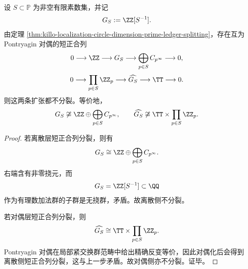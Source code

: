 \begin{theorem}[局部化数系扩张在离散层与对偶层都严格不分裂]\label{thm:conclusion-localized-discrete-dual-extension-nonsplit}
设 \(S\subset\mathbb P\) 为非空有限素数集，并记
\[
G_S:=\ZZ[S^{-1}].
\]
由定理 \ref{thm:killo-localization-circle-dimension-prime-ledger-splitting}，存在互为 Pontryagin 对偶的短正合列
\[
0\longrightarrow \ZZ\longrightarrow G_S\longrightarrow \bigoplus_{p\in S}C_{p^\infty}\longrightarrow 0,
\]
\[
0\longrightarrow \prod_{p\in S}\ZZ_p\longrightarrow \widehat{G_S}\longrightarrow \TT\longrightarrow 0.
\]
则这两条扩张都不分裂。等价地，
\[
G_S\not\cong \ZZ\oplus \bigoplus_{p\in S}C_{p^\infty},
\qquad
\widehat{G_S}\not\cong \TT\times \prod_{p\in S}\ZZ_p.
\]
\end{theorem}
\begin{proof}
若离散层短正合列分裂，则有
\[
G_S\cong \ZZ\oplus \bigoplus_{p\in S}C_{p^\infty}.
\]
右端含有非零挠元，而
\[
G_S=\ZZ[S^{-1}]\subset \QQ
\]
作为有理数加法群的子群是无挠群，矛盾。故离散侧不分裂。

若对偶层短正合列分裂，则
\[
\widehat{G_S}\cong \TT\times \prod_{p\in S}\ZZ_p.
\]
Pontryagin 对偶在局部紧交换群范畴中给出精确反变等价，因此对偶化后会得到离散侧短正合列分裂，这与上一步矛盾。故对偶侧亦不分裂。证毕。
\end{proof}

